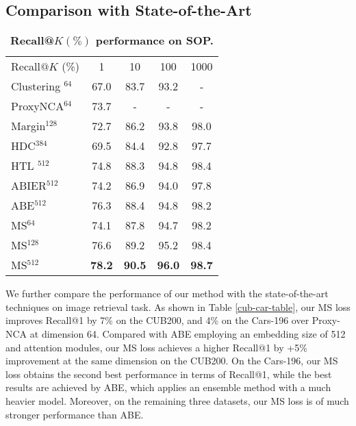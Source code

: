 \documentclass[10pt,twocolumn,letterpaper]{article}
\newcommand{\tablestyle}[2]{\setlength{\tabcolsep}{#1}\renewcommand{\arraystretch}{#2}\centering\footnotesize}
\begin{document}
\subsection{Comparison with State-of-the-Art}
\begin{table}[htp]
    \tablestyle{12pt}{1.1}
	\begin{center}
		\begin{tabular}{l|cccc}
			Recall$@K$ (\%)& 1 & 10 & 100 & 1000\\ \shline
			{Clustering $^{64}$\cite{struct-clustering}}  & 67.0 & 83.7 & 93.2 & -\\
			{ProxyNCA$^{64}$} \cite{proxyloss} & 73.7 & -& -& -\\
			{Margin$^{128}$ \cite{sampling}} & 72.7 & 86.2 & 93.8 & 98.0\\
			HDC$^{384}$ \cite{struct-clustering}& 69.5 & 84.4 & 92.8 & 97.7 \\	
			HTL $^{512}$ \cite{HTL} & 74.8& 88.3& 94.8& 98.4\\\hline
			ABIER$^{512}$ \cite{bier}  & 74.2 & 86.9 & 94.0 & 97.8 \\	
			ABE$^{512}$ \cite{Kim_2018_ECCV} &76.3 & 88.4 & 94.8 & 98.2\\ 
			\hline
			{MS}$^{64}$   & 74.1& 87.8& 94.7& 98.2 \\
			{MS}$^{128}$   & 76.6& 89.2& 95.2& 98.4\\
			{MS}$^{512}$   & \bf  78.2& \bf  90.5& \bf  96.0& \bf  98.7 \\
\end{tabular}
		\vspace{4pt}
		\caption{\textbf{Recall@$K(\%)$ performance on SOP.}}
		\label{sop-table}
		\vspace{-10pt}
	\end{center}
\end{table}

We further compare the performance of our method with the state-of-the-art techniques on image retrieval task.
As shown in Table \ref{cub-car-table}, our MS loss improves Recall@1 by 7\%  on the CUB200, and 4\% on the Cars-196 over Proxy-NCA at dimension 64.  Compared with ABE employing an embedding size of 512 and attention modules, our MS loss achieves a higher Recall@1 by +5\% improvement at the same dimension on the CUB200.
On the Cars-196, our MS loss obtains the second best performance in terms of Recall@1, while the best results are achieved by ABE, which applies an ensemble method with a much heavier model. Moreover, on the remaining three datasets, our MS loss is of much stronger performance than ABE. 
\end{document}
